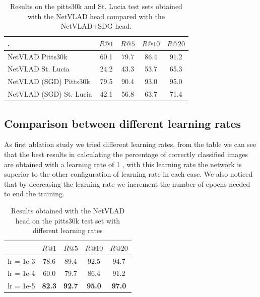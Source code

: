 \documentclass[10pt,twocolumn,letterpaper]{article}
\begin{document}
	\begin{table}[!h]
		\centering
		\begin{tabular}{|l|c|c|c|c|}
			\hline
			.&        $R@1$   &        $R@5$   &        $R@10$  &        $R@20$   \\ \hline
			NetVLAD  Pitts30k     &         60.1   &         79.7   &          86.4   &          91.2   \\
			NetVLAD St. Lucia        &         24.2   &         43.3   &          53.7   &          65.3   \\ \hline
			NetVLAD (SGD) Pitts30k  &         79.5   &         90.4   &          93.0   &          95.0   \\ 
			NetVLAD (SGD) St. Lucia      &         42.1   & 56.8  &  63.7  &  71.4  \\
			 \hline
		\end{tabular}
		\caption{Results on the pitts30k and St. Lucia test sets obtained with the NetVLAD head compared with the NetVLAD+SDG head.}
		\label{tab:base_results}
	\end{table}
	
	\subsection{Comparison between different learning rates}
	As first ablation study we tried different learning rates, from the table we can see that the best results in calculating the percentage of correctly classified images are obtained with a learning rate of 1 , with this learning rate the network is superior to the other configuration of learning rate in each case. We also noticed that by decreasing the learning rate we increment the number of epochs needed to end the training.
	\begin{table}[!h]
		\centering
		\begin{tabular}{|l|c|c|c|c|}
			\hline
			&          $R@1$  &        $R@5$  &        $R@10$ &        $R@20$   \\ \hline     
			lr = 1e-3 &         78.6    &    89.4       &    92.5       &         94.7       \\
			lr = 1e-4 &         60.0    &         79.7  & 86.4 & 91.2  \\    
			lr = 1e-5 & \textbf{82.3}   & \textbf{92.7} &         \textbf{95.0}  & \textbf{97.0}          \\
			\hline
		\end{tabular}
		\caption{Results obtained with the NetVLAD head on the pitts30k test set with different learning rates}
		\label{tab:NETVLAD:lr}
	\end{table}
\end{document}
